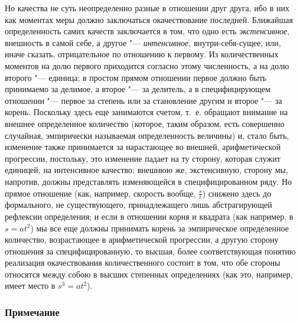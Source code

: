 Но качества не суть неопределенно разные в отношении друг друга, ибо в них
как моментах меры должно заключаться окачествование последней. Ближайшая
определенность самих качеств заключается в том, что одно есть
{\em экстенсивное}, внешность в самой себе, а другое
"--- {\em интенсивное}, внутри-себя-сущее, или, иначе
сказать, отрицательное по отношению к первому. Из количественных моментов
на долю первого приходится согласно этому численность, а на долю второго
"--- единица; в простом прямом отношении первое должно быть принимаемо за
делимое, а второе "--- за делитель, а в специфицирующем отношении "--- первое
за степень или за становление другим и второе "--- за корень. Поскольку здесь
еще занимаются счетом, т.~е. обращают внимание на внешнее определенное
количество (которое, таким образом, есть совершенно случайная, эмпирически
называемая определенность величины) и, стало быть, изменение также
принимается за нарастающее во внешней, арифметической прогрессии,
постольку, это изменение падает на ту сторону, которая служит единицей, на
интенсивное качество; внешнюю же, экстенсивную, сторону мы, напротив,
должны представлять изменяющейся в специфицированном ряду. Но прямое
отношение (как, например, скорость вообще, $\frac s t$) снижено здесь до
формального, не существующего, принадлежащего лишь абстрагирующей рефлексии
определения; и если в отношении корня и квадрата (как например, в
$s=at^2$) мы все еще должны принимать корень за эмпирическое определенное
количество, возрастающее в арифметической прогрессии, а другую сторону
отношения за специфицированную, то высшая, более соответствующая понятию
реализация окачествования количественного состоит в том, что обе стороны
относятся между собою в высших степенных определениях (как это, например,
имеет место в $s^3=at^2$).


\subsubsection[Примечание]{Примечание}

